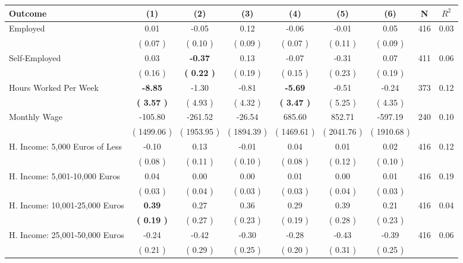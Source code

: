 \begin{tabular}{lcccccccc}
\toprule
 \textbf{Outcome} & \textbf{(1)} & \textbf{(2)} & \textbf{(3)} & \textbf{(4)} & \textbf{(5)} & \textbf{(6)} & \textbf{N} & \textbf{$ R^2$} \\
\midrule
Employed &      0.01 &     -0.05 &      0.12 &     -0.06 &     -0.01 &      0.05 & 416 &       0.03 \\ 
 & (     0.07 ) & (     0.10 ) & (     0.09 ) & (     0.07 ) & (     0.11 ) & (     0.09 ) & \\
Self-Employed &      0.03 & \textbf{    -0.37} &      0.13 &     -0.07 &     -0.31 &      0.07 & 411 &       0.06 \\ 
 & (     0.16 ) & \textbf{(     0.22 )} & (     0.19 ) & (     0.15 ) & (     0.23 ) & (     0.19 ) & \\
Hours Worked Per Week & \textbf{    -8.85} &     -1.30 &     -0.81 & \textbf{    -5.69} &     -0.51 &     -0.24 & 373 &       0.12 \\ 
 & \textbf{(     3.57 )} & (     4.93 ) & (     4.32 ) & \textbf{(     3.47 )} & (     5.25 ) & (     4.35 ) & \\
Monthly Wage &   -105.80 &   -261.52 &    -26.54 &    685.60 &    852.71 &   -597.19 & 240 &       0.10 \\ 
 & (  1499.06 ) & (  1953.95 ) & (  1894.39 ) & (  1469.61 ) & (  2041.76 ) & (  1910.68 ) & \\
H. Income: 5,000 Euros of Less &     -0.10 &      0.13 &     -0.01 &      0.04 &      0.01 &      0.02 & 416 &       0.12 \\ 
 & (     0.08 ) & (     0.11 ) & (     0.10 ) & (     0.08 ) & (     0.12 ) & (     0.10 ) & \\
H. Income: 5,001-10,000 Euros &      0.04 &      0.00 &      0.00 &      0.01 &      0.00 &      0.01 & 416 &       0.19 \\ 
 & (     0.03 ) & (     0.04 ) & (     0.03 ) & (     0.03 ) & (     0.04 ) & (     0.03 ) & \\
H. Income: 10,001-25,000 Euros & \textbf{     0.39} &      0.27 &      0.36 &      0.29 &      0.39 &      0.21 & 416 &       0.04 \\ 
 & \textbf{(     0.19 )} & (     0.27 ) & (     0.23 ) & (     0.19 ) & (     0.28 ) & (     0.23 ) & \\
H. Income: 25,001-50,000 Euros &     -0.24 &     -0.42 &     -0.30 &     -0.28 &     -0.43 &     -0.39 & 416 &       0.06 \\ 
 & (     0.21 ) & (     0.29 ) & (     0.25 ) & (     0.20 ) & (     0.31 ) & (     0.25 ) & \\

\end{tabular}
